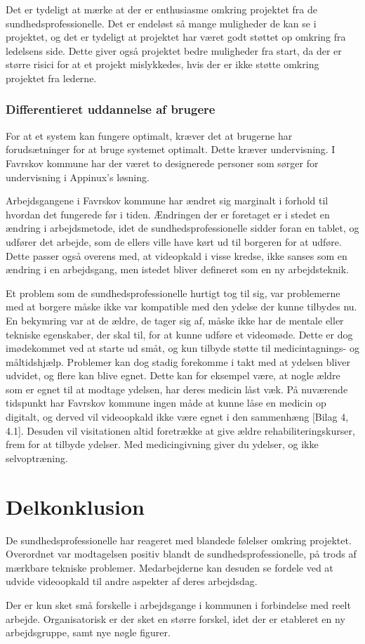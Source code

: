 Det er tydeligt at mærke at der er enthusiasme omkring projektet fra de sundhedsprofessionelle. Det er endeløst så mange muligheder de kan se i projektet, og det er tydeligt at projektet har været godt støttet op omkring fra ledelsens side. Dette giver også projektet bedre muligheder fra start, da der er større risici for at et projekt mislykkedes, hvis der er ikke støtte omkring projektet fra lederne\cite{Ikt}. 

\subsubsection{Differentieret uddannelse af brugere}

For at et system kan fungere optimalt, kræver det at brugerne har forudsætninger for at bruge systemet optimalt. Dette kræver undervisning\cite{Ikt}. I Favrskov kommune har der været to designerede personer som sørger for undervisning i Appinux’s løsning. 

Arbejdsgangene i Favrskov kommune har ændret sig marginalt i forhold til hvordan det fungerede før i tiden. Ændringen der er foretaget er i stedet en ændring i arbejdsmetode, idet de sundhedsprofessionelle sidder foran en tablet, og udfører det arbejde, som de ellers ville have kørt ud til borgeren for at udføre. Dette passer også overens med, at videopkald i visse kredse, ikke sanses som en ændring i en arbejdsgang, men istedet bliver defineret som en ny arbejdsteknik\cite{telenursing}.  

Et problem som de sundhedsprofessionelle hurtigt tog til sig, var problemerne med at borgere måske ikke var kompatible med den ydelse der kunne tilbydes nu. En bekymring var at de ældre, de tager sig af, måske ikke har de mentale eller tekniske egenskaber, der skal til, for at kunne udføre et videomøde. Dette er dog imødekommet ved at starte ud småt, og kun tilbyde støtte til medicintagnings- og måltidshjælp. Problemer kan dog stadig forekomme i takt med at ydelsen bliver udvidet, og flere kan blive egnet. Dette kan for eksempel være, at nogle ældre som er egnet til at modtage ydelsen, har deres medicin låst væk. På nuværende tidspunkt har Favrskov kommune ingen måde at kunne låse en medicin op digitalt, og derved vil videoopkald ikke være egnet i den sammenhæng [Bilag 4, 4.1]. Desuden vil visitationen altid foretrække at give ældre rehabiliteringskurser, frem for at tilbyde ydelser. Med medicingivning giver du ydelser, og ikke selvoptræning. 


\section{Delkonklusion}
De sundhedsprofessionelle har reageret med blandede følelser omkring projektet. Overordnet var modtagelsen positiv blandt de sundhedsprofessionelle, på trods af mærkbare tekniske problemer. Medarbejderne kan desuden se fordele ved at udvide videoopkald til andre aspekter af deres arbejdsdag. 

Der er kun sket små forskelle i arbejdsgange i kommunen i forbindelse med reelt arbejde. Organisatorisk er der sket en større forskel, idet der er etableret en ny arbejdsgruppe, samt nye nøgle figurer.
